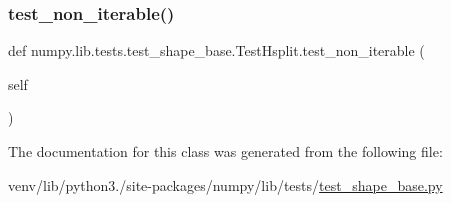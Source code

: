 \mbox{\label{classnumpy_1_1lib_1_1tests_1_1test__shape__base_1_1TestHsplit_a1bb06067628b5db64ac5d9c8147486f5}} 
\subsubsection{\texorpdfstring{test\+\_\+non\+\_\+iterable()}{test\_non\_iterable()}}
{\footnotesize\ttfamily def numpy.\+lib.\+tests.\+test\+\_\+shape\+\_\+base.\+Test\+Hsplit.\+test\+\_\+non\+\_\+iterable (\begin{DoxyParamCaption}\item[{}]{self }\end{DoxyParamCaption})}



The documentation for this class was generated from the following file\+:\begin{DoxyCompactItemize}
\item 
venv/lib/python3./site-\/packages/numpy/lib/tests/\hyperlink{lib_2tests_2test__shape__base_8py}{test\+\_\+shape\+\_\+base.\+py}\end{DoxyCompactItemize}
